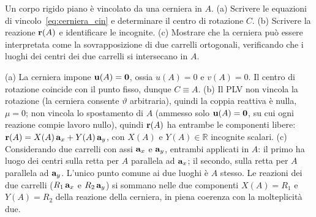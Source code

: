 \begin{esercizio}[Cerniera]
	\label{ex:C04_cerniera}
	
	Un corpo rigido piano è vincolato da una cerniera in $A$.
	(a) Scrivere le equazioni di vincolo~\eqref{eq:cerniera_cin} e determinare il centro di rotazione $C$.
	(b) Scrivere la reazione $\mathbf{r}(A)$ e identificare le incognite.
	(c) Mostrare che la cerniera può essere interpretata come la sovrapposizione di due carrelli ortogonali, verificando che i luoghi dei centri dei due carrelli si intersecano in $A$.
	
	\risultato (a) La cerniera impone $\mathbf{u}(A) = \mathbf{0}$, ossia $u(A) = 0$ e $v(A) = 0$. Il centro di rotazione coincide con il punto fisso, dunque $C \equiv A$. (b) Il PLV non vincola la rotazione (la cerniera consente $\vartheta$ arbitraria), quindi la coppia reattiva è nulla, $\mu = 0$; non vincola lo spostamento di $A$ (ammesso solo $\mathbf{u}(A) = \mathbf{0}$, su cui ogni reazione compie lavoro nullo), quindi $\mathbf{r}(A)$ ha entrambe le componenti libere: $\mathbf{r}(A) = X(A)\,\mathbf{a}_x + Y(A)\,\mathbf{a}_y$, con $X(A)$ e $Y(A) \in \mathbb{R}$ incognite scalari. (c) Considerando due carrelli con assi $\mathbf{a}_x$ e $\mathbf{a}_y$, entrambi applicati in $A$: il primo ha luogo dei centri sulla retta per $A$ parallela ad $\mathbf{a}_x$; il secondo, sulla retta per $A$ parallela ad $\mathbf{a}_y$. L'unico punto comune ai due luoghi è $A$ stesso. Le reazioni dei due carrelli ($R_1\,\mathbf{a}_x$ e $R_2\,\mathbf{a}_y$) si sommano nelle due componenti $X(A) = R_1$ e $Y(A) = R_2$ della reazione della cerniera, in piena coerenza con la molteplicità due.
	
\end{esercizio}

